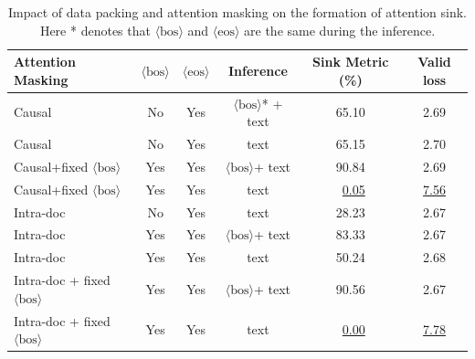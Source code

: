 \documentclass{article} %
\newcommand{\bos}{\ensuremath{\langle\text{bos}\rangle}\xspace}
\newcommand{\eos}{\ensuremath{\langle\text{eos}\rangle}\xspace}
\begin{document}
\begin{table}[h]
    \centering
    \begin{tabular}{lccccc}
        \toprule
        \textbf{Attention Masking} & \bos & \eos & \textbf{Inference} & \textbf{Sink Metric} (\%) & \textbf{Valid loss} \\
        \midrule
        Causal   & No   & Yes  & \bos* + text & 65.10  & 2.69 \\
        Causal   & No   & Yes  & text &  65.15 & 2.70 \\
        \midrule
        Causal+fixed \bos & Yes & Yes & \bos + text &  90.84 & 2.69 \\
        Causal+fixed \bos & Yes & Yes &  text &  \,\,\,\underline{0.05} & \underline{7.56} \\
        \midrule
        Intra-doc & No & Yes & text &  28.23 & 2.67 \\
        Intra-doc & Yes & Yes & \bos + text & 83.33 & 2.67 \\
        Intra-doc & Yes & Yes & text & 50.24 & 2.68 \\
        \midrule
        Intra-doc + fixed \bos & Yes & Yes & \bos + text & 90.56 & 2.67 \\
        Intra-doc + fixed \bos & Yes & Yes & text & \,\,\,\underline{0.00} & \underline{7.78} \\
        \bottomrule
    \end{tabular}
    \caption{Impact of data packing and attention masking on the formation of attention sink. Here * denotes that \bos and \eos are the same during the inference.}
    \label{tab:data_packing}
\end{table}





 
\end{document}
